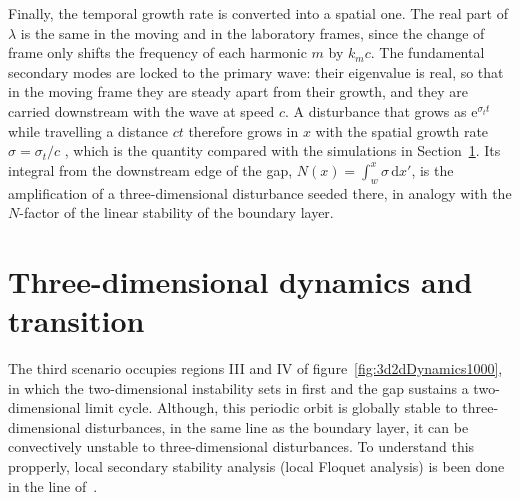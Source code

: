 \documentclass[lineno]{jfm}
\begin{document}
Finally, the temporal growth rate is converted into a spatial one. The real part of $\lambda$ is the same in the moving and in the laboratory frames, since the change of frame only shifts the frequency of each harmonic $m$ by $k_mc$. The fundamental secondary modes are locked to the primary wave: their eigenvalue is real, so that in the moving frame they are steady apart from their growth, and they are carried downstream with the wave at speed $c$. A disturbance that grows as $\mathrm{e}^{\sigma_tt}$ while travelling a distance $ct$ therefore grows in $x$ with the spatial growth rate $\sigma=\sigma_t/c$ \citep{gaster1962,herbert1988}, which is the quantity compared with the simulations in Section~\ref{sec:3Ddynamics}. Its integral from the downstream edge of the gap, $N(x)=\int_w^x\sigma\,\mathrm{d}x'$, is the amplification of a three-dimensional disturbance seeded there, in analogy with the $N$-factor of the linear stability of the boundary layer.

\section{Three-dimensional dynamics and transition}\label{sec:3Ddynamics}
The third scenario occupies regions III and IV of figure~\ref{fig:3d2dDynamics1000}, in which the two-dimensional instability sets in first and the gap sustains a two-dimensional limit cycle. Although, this periodic orbit is globally stable to three-dimensional disturbances, in the same line as the boundary layer, it can be convectively unstable to three-dimensional disturbances. To understand this propperly, local secondary stability analysis (local Floquet analysis) is been done in the line of~\cite{herbert1988}.
\end{document}

